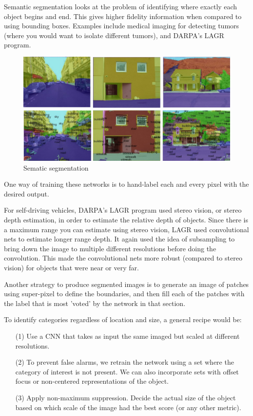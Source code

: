 Semantic segmentation looks at the problem of identifying where exactly each object begins and end.
This gives higher fidelity information when compared to using bounding boxes.
Examples include medical imaging for detecting tumors (where you would want to isolate different tumors), and DARPA's LAGR program.

\begin{figure}[ht]
\centering
	\includegraphics[width=0.8\linewidth]{figs/semantic-segmentation.png}
	\caption{Sematic segmentation}
\label{fig:SemanticSegmentation}
\end{figure}

One way of training these networks is to hand-label each and every pixel with the desired output.

For self-driving vehicles, DARPA's LAGR program used stereo vision, or stereo depth estimation, in order to estimate the relative depth of objects.
Since there is a maximum range you can estimate using stereo vision, LAGR used convolutional nets to estimate longer range depth.
It again used the idea of subsampling to bring down the image to multiple different resolutions before doing the convolution.
This made the convolutional nets more robust (compared to stereo vision) for objects that were near or very far.


Another strategy to produce segmented images is to generate an image of patches using super-pixel to define the boundaries, and then fill each of the patches with the label that is most 'voted' by the network in that section. 

\noindent
To identify categories regardless of location and size, a general recipe would be:
\begin{itemize}
\item[(1)] Use a CNN that takes as input the same imaged but scaled at different resolutions. 
\item[(2)] To prevent false alarms, we retrain the network using a set where the category of interest is not present. We can also incorporate sets with offset focus or non-centered representations of the object. 
\item[(3)] Apply non-maximum suppression. Decide the actual size of the object based on which scale of the image had the best score (or any other metric). 
\end{itemize}

